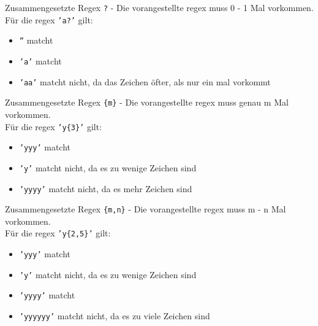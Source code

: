 \begin{frame}{Zusammengesetzte Regex}
	\texttt{?} - Die \alert{vorangestellte} regex muss 0 - 1 Mal vorkommen.\\[.25cm]
	Für die regex \texttt{'a?'} gilt:\\
	\begin{itemize}
		\item \texttt{''} matcht
		\item \texttt{'a'} matcht
		\item \texttt{'aa'} matcht nicht, da das Zeichen öfter, als nur ein mal vorkommt
	\end{itemize}
\end{frame}

\begin{frame}{Zusammengesetzte Regex}
	\texttt{\{m\}} - Die \alert{vorangestellte} regex muss genau m Mal vorkommen.\\[.25cm]
	Für die regex \texttt{'y\{3\}'} gilt:\\
	\begin{itemize}
		\item \texttt{'yyy'} matcht
		\item \texttt{'y'} matcht nicht, da es zu wenige Zeichen sind
		\item \texttt{'yyyy'} matcht nicht, da es mehr Zeichen sind
	\end{itemize}
\end{frame}

\begin{frame}{Zusammengesetzte Regex}
	\texttt{\{m,n\}} -  Die \alert{vorangestellte} regex muss m - n Mal vorkommen.\\[.25cm]
	Für die regex \texttt{'y\{2,5\}'} gilt:\\
	\begin{itemize}
		\item \texttt{'yyy'} matcht
		\item \texttt{'y'} matcht nicht, da es zu wenige Zeichen sind
		\item \texttt{'yyyy'} matcht
		\item \texttt{'yyyyyy'} matcht nicht, da es zu viele Zeichen sind
	\end{itemize}
\end{frame}

